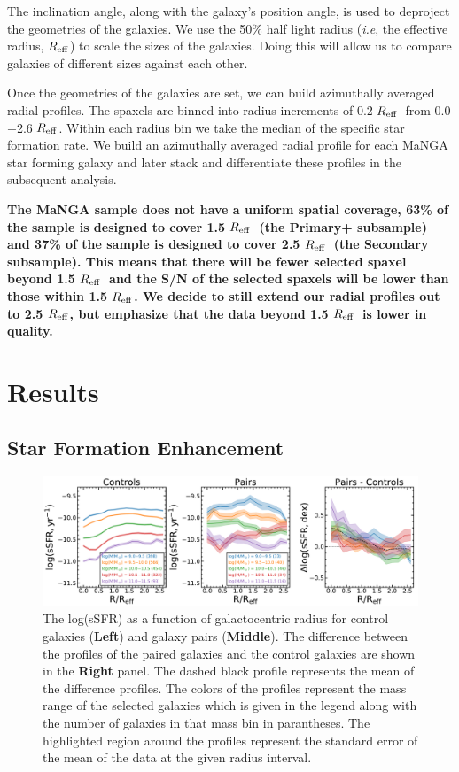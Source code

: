 \documentclass[iop,revtex4,twocolumn,apj,numberedappendix,appendixfloats]{emulateapj}
\newcommand{\reff}{$R_{\rm eff}$}
\begin{document}
The inclination angle, along with the galaxy's position angle, is used to deproject the geometries of the galaxies. We use the 50\% half light radius ({\it i.e}, the effective radius, \reff) to scale the sizes of the galaxies. Doing this will allow us to compare galaxies of different sizes against each other.

Once the geometries of the galaxies are set, we can build azimuthally averaged radial profiles. The spaxels are binned into radius increments of 0.2 \reff\ from 0.0$-$2.6 \reff. Within each radius bin we take the median of the specific star formation rate. We build an azimuthally averaged radial profile for each MaNGA star forming galaxy and later stack and differentiate these profiles in the subsequent analysis. 

\textbf{The MaNGA sample does not have a uniform spatial coverage, 63\% of the sample is designed to cover 1.5 \reff\ (the Primary+ subsample) and 37\% of the sample is designed to cover 2.5 \reff\ (the Secondary subsample). This means that there will be fewer selected spaxel beyond 1.5 \reff\ and the S/N of the selected spaxels will be lower than those within 1.5 \reff. We decide to still extend our radial profiles out to 2.5 \reff, but emphasize that the data beyond 1.5 \reff\ is lower in quality. } 


\section{Results}\label{sec:results}

\subsection{Star Formation Enhancement}

\begin{figure}
\centering
\includegraphics[width=\linewidth]{fig/ssfr_comb.pdf}
\caption[]{The log(sSFR) as a function of galactocentric radius for control galaxies (\textbf{Left}) and galaxy pairs (\textbf{Middle}). The difference between the profiles of the paired galaxies and the control galaxies are shown in the \textbf{Right} panel. The dashed black profile represents the mean of the difference profiles. The colors of the profiles represent the mass range of the selected galaxies which is given in the legend along with the number of galaxies in that mass bin in parantheses. The highlighted region around the profiles represent the standard error of the mean of the data at the given radius interval. }
\label{fig:ssfr_prof}
\end{figure}
\end{document}
